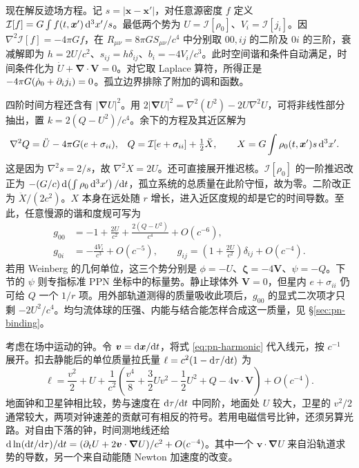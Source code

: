 现在解反迹场方程。记 $s=|\bm x-\bm x'|$，对任意源密度 $f$ 定义 $\mathcal I[f]=G\int f(t,\bm x')\,\dd^3x'/s$。最低两个势为 $U=\mathcal I[\rho_0]$、$V_i=\mathcal I[j_i]$。因 $\nabla^2\mathcal I[f]=-4\pi G f$，在 $R_{\mu\nu}=8\pi G S_{\mu\nu}/c^4$ 中分别取 $00,ij$ 的二阶及 $0i$ 的三阶，衰减解即为 $h=2U/c^2$、$s_{ij}=h\delta_{ij}$、$b_i=-4V_i/c^3$。此时空间谐和条件自动满足，时间条件化为 $\dot U+\bm\nabla\cdot\bm V=0$。对它取 Laplace 算符，所得正是 $-4\pi G(\dot\rho_0+\partial_i j_i)=0$。孤立边界排除了附加的调和函数。

四阶时间方程还含有 $|\bm\nabla U|^2$。用 $2|\bm\nabla U|^2=\nabla^2(U^2)-2U\nabla^2 U$，可将非线性部分抽出，置 $k=2(Q-U^2)/c^4$。余下的方程及其近区解为
\begin{align}
 \nabla^2Q&=\ddot U-4\pi G(e+\sigma_{ii}),&
 Q&=\mathcal I[e+\sigma_{ii}]+\tfrac12\ddot X,\qquad
 X=G\int\rho_0(t,\bm x')s\,\dd^3x'.\label{eq:pn-Q}
\end{align}
这是因为 $\nabla^2s=2/s$，故 $\nabla^2X=2U$。还可直接展开推迟核。$\mathcal I[\rho_0]$ 的一阶推迟改正为 $-(G/c)\dd(\int\rho_0\,\dd^3x')/\dd t$，孤立系统的总质量在此阶守恒，故为零。二阶改正为 $\ddot X/(2c^2)$。$X$ 本身在远处随 $r$ 增长，进入近区度规的却是它的时间导数。至此，任意慢源的谐和度规可写为
\begin{equation}\label{eq:pn-harmonic}
 \begin{aligned}
 g_{00}&=-1+\frac{2U}{c^2}+\frac{2(Q-U^2)}{c^4}+O(c^{-6}),\\
 g_{0i}&=-\frac{4V_i}{c^3}+O(c^{-5}),\qquad
 g_{ij}=\left(1+\frac{2U}{c^2}\right)\delta_{ij}+O(c^{-4}).
 \end{aligned}
\end{equation}
若用 Weinberg 的几何单位，这三个势分别是 $\phi=-U$、$\bm\zeta=-4\bm V$、$\psi=-Q$。下节的 $\psi$ 则专指标准 PPN 坐标中的标量势。静止球体外 $\bm V=0$，但星内 $e+\sigma_{ii}$ 仍可给 $Q$ 一个 $1/r$ 项。用外部轨道测得的质量吸收此项后，$g_{00}$ 的显式二次项才只剩 $-2U^2/c^4$。均匀流体球的压强、内能与结合能怎样合成这一质量，见 \S\ref{sec:pn-binding}。

考虑在场中运动的钟。令 $\bm v=\dd\bm x/\dd t$，将式 \eqref{eq:pn-harmonic} 代入线元，按 $c^{-1}$ 展开。扣去静能后的单位质量拉氏量 $\ell=c^2(1-\dd\tau/\dd t)$ 为
\begin{equation}\label{eq:pn-test-L}
 \ell=\frac{v^2}{2}+U+\frac{1}{c^2}
   \left(\frac{v^4}{8}+\frac32Uv^2-\frac12 U^2+Q-4\bm v\cdot\bm V\right)
   +O(c^{-4}).
\end{equation}
地面钟和卫星钟相比较，势与速度在 $\dd\tau/\dd t$ 中同阶，地面处 $U$ 较大，卫星的 $v^2/2$ 通常较大，两项对钟速差的贡献可有相反的符号。若用电磁信号比钟，还须另算光路。对自由下落的钟，时间测地线还给 $\dd\ln(\dd t/\dd\tau)/\dd t=(\partial_t U+2\bm v\cdot\bm\nabla U)/c^2+O(c^{-4})$。其中一个 $\bm v\cdot\bm\nabla U$ 来自沿轨道求势的导数，另一个来自动能随 Newton 加速度的改变。

